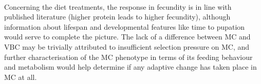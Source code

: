\documentclass[12pt,onecolumn,twoside]{article}
\begin{document}
	\paragraph{\empty} Concerning the diet treatments, the response in fecundity is in line with published literature (higher protein leads to higher fecundity), although information about lifespan and developmental features like time to pupation would serve to complete the picture. The lack of a difference between MC and VBC may be trivially attributed to insufficient selection pressure on MC, and further characterisation of the MC phenotype in terms of its feeding behaviour and metabolism would help determine if any adaptive change has taken place in MC at all.
	
	
\end{document}
